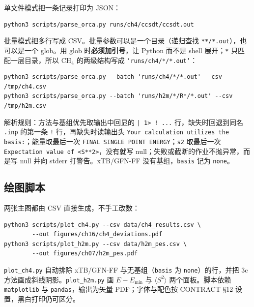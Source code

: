 单文件模式把一条记录打印为 JSON：
\begin{lstlisting}
python3 scripts/parse_orca.py runs/ch4/ccsdt/ccsdt.out
\end{lstlisting}
批量模式把多行写成 CSV。批量参数可以是一个目录（递归查找 \texttt{**/*.out}），也可以是一个 glob。用 glob 时\textbf{必须加引号}，让 Python 而不是 shell 展开；\texttt{*} 只匹配一层目录，所以 CH$_4$ 的两级结构写成 \texttt{'runs/ch4/*/*.out'}：
\begin{lstlisting}
python3 scripts/parse_orca.py --batch 'runs/ch4/*/*.out' --csv /tmp/ch4.csv
python3 scripts/parse_orca.py --batch 'runs/h2m/*/R*/*.out' --csv /tmp/h2m.csv
\end{lstlisting}
解析规则：方法与基组优先取输出中回显的 \texttt{| 1> ! ...} 行，缺失时回退到同名 \texttt{.inp} 的第一条 \texttt{!} 行，再缺失时读输出头 \texttt{Your calculation utilizes the basis:}；能量取最后一次 \texttt{FINAL SINGLE POINT ENERGY}；\texttt{s2} 取最后一次 \texttt{Expectation value of <S**2>}，没有就写 null；失败或截断的作业不抛异常，而是写 null 并向 stderr 打警告。xTB/GFN-FF 没有基组，\texttt{basis} 记为 \texttt{none}。

\subsection{绘图脚本}

两张主图都由 CSV 直接生成，不手工改数：
\begin{lstlisting}
python3 scripts/plot_ch4.py --csv data/ch4_results.csv \
        --out figures/ch16/ch4_deviations.pdf
python3 scripts/plot_h2m.py --csv data/h2m_pes.csv \
        --out figures/ch07/h2m_pes.pdf
\end{lstlisting}
\texttt{plot\_ch4.py} 自动排除 xTB/GFN-FF 与无基组（\texttt{basis} 为 \texttt{none}）的行，并把 3c 方法画成斜线阴影。\texttt{plot\_h2m.py} 画 $E-E_{\min}$ 与 $\langle S^2\rangle$ 两个面板。脚本依赖 \texttt{matplotlib} 与 \texttt{pandas}，输出为矢量 PDF；字体与配色按 CONTRACT §12 设置，黑白打印仍可区分。

